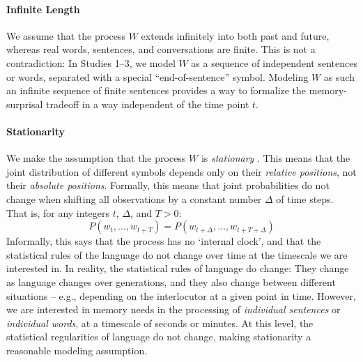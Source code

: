 \documentclass[11pt,letterpaper]{article}
\begin{document}
\paragraph{Infinite Length}
We assume that the process $W$ extends infinitely into both past and future, whereas real words, sentences, and conversations are finite.
This is not a contradiction:
In Studies 1--3, we model $W$ as a sequence of independent sentences or words, separated with a special ``end-of-sentence'' symbol.
Modeling $W$ as such an infinite sequence of finite sentences provides a way to formalize the memory-surprisal tradeoff in a way independent of the time point $t$.



%

\paragraph{Stationarity}
We make the assumption that the process $W$ is \emph{stationary} \citep{doob1953stochastic}.
This means that the joint distribution of different symbols depends only on their \emph{relative positions}, not their \emph{absolute positions}.
Formally, this means that joint probabilities do not change when shifting all observations by a constant number $\Delta$ of time steps. That is, for any integers $t$, $\Delta$, and $T>0$:
\begin{equation}
	P(w_t, \dots, w_{t+T}) = 	P(w_{t+\Delta}, \dots, w_{t+T+\Delta})
\end{equation}
Informally, this says that the process has no `internal clock', and that the statistical rules of the language do not change over time at the timescale we are interested in.
In reality, the statistical rules of language do change: They change as language changes over generations, and they also change between different situations -- e.g., depending on the interlocutor at a given point in time.
However, we are interested in memory needs in the processing of \emph{individual sentences} or \emph{individual words}, at a timescale of seconds or minutes.
At this level, the statistical regularities of language do not change, making stationarity a reasonable modeling assumption.
\end{document}
